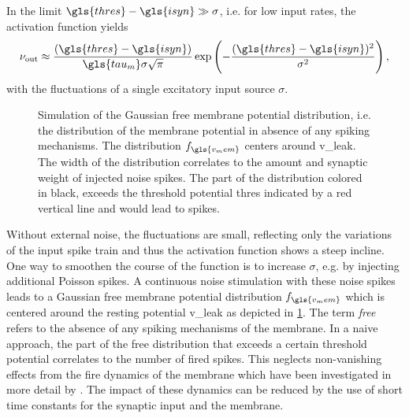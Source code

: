 In the limit $\gls{thres} - \gls{isyn} \gg \sigma$, i.e. for low input rates, the activation function yields
\begin{equation}
\nu_\text{out} \approx \frac{(\gls{thres} - \gls{isyn})}{\gls{tau_m}\sigma \sqrt{\pi}} \exp\left(-\frac{(\gls{thres} - \gls{isyn})^2}{\sigma^2}\right),
\label{fireratelow}
\end{equation}
with the fluctuations of a single excitatory input source $\sigma$.

\begin{figure}[ht!]
	\begin{center}
		
	\end{center}
	\caption[Simulation of the Gaussian free membrane potential distribution.]{Simulation of the Gaussian free membrane potential distribution, i.e. the distribution of the membrane potential in absence of any spiking mechanisms. The distribution $f_{\gls{v_mem}}$ centers around \gls{v_leak}. The width of the distribution correlates to the amount and synaptic weight of injected noise spikes. The part of the distribution colored in black, exceeds the threshold potential \gls{thres} indicated by a red vertical line and would lead to spikes.}
	\label{theoretical_vleak_w_noise}
\end{figure}

Without external noise, the fluctuations are small, reflecting only the variations of the input spike train and thus the activation function shows a steep incline. One way to smoothen the course of the function is to increase $\sigma$, e.g. by injecting additional Poisson spikes. A continuous noise stimulation with these noise spikes leads to a Gaussian free membrane potential distribution $f_{\gls{v_mem}}$ which is centered around the resting potential \gls{v_leak} as depicted in \cref{theoretical_vleak_w_noise}. The term \emph{free} refers to the absence of any spiking mechanisms of the membrane. In a naive approach, the part of the free distribution that exceeds a certain threshold potential correlates to the number of fired spikes. This neglects non-vanishing effects from the fire dynamics of the membrane which have been investigated in more detail by \cite{petrovici12phdthesis}. The impact of these dynamics can be reduced by the use of short time constants for the synaptic input and the membrane.

